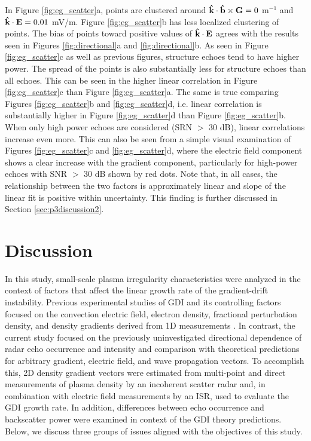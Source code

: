 In Figure \ref{fig:eg_scatter}a, points are clustered around \(\mathbf{\hat{k}}\cdot\mathbf{\hat{b}}\times\mathbf{G} = 0\) m\(^{-1}\) and \(\mathbf{\hat{k}}\cdot\mathbf{E} = 0.01\) mV/m.  Figure \ref{fig:eg_scatter}b has less localized clustering of points.  The bias of points toward positive values of \(\mathbf{\hat{k}}\cdot\mathbf{E}\) agrees with the results seen in Figures \ref{fig:directional}a and \ref{fig:directional}b.  As seen in Figure \ref{fig:eg_scatter}c as well as previous figures, structure echoes tend to have higher power.  The spread of the points is also substantially less for structure echoes than all echoes.  This can be seen in the higher linear correlation in Figure \ref{fig:eg_scatter}c than Figure \ref{fig:eg_scatter}a.  The same is true comparing Figures \ref{fig:eg_scatter}b and \ref{fig:eg_scatter}d, i.e. linear correlation is substantially higher in Figure \ref{fig:eg_scatter}d than Figure \ref{fig:eg_scatter}b. When only high power echoes are considered (SRN \(>\) 30 dB), linear correlations increase even more.  This can also be seen from a simple visual examination of Figures \ref{fig:eg_scatter}c and \ref{fig:eg_scatter}d, where the electric field component shows a clear increase with the gradient component, particularly for high-power echoes with SNR \(>\) 30 dB shown by red dots. Note that, in all cases, the relationship between the two factors is approximately linear and slope of the linear fit is positive within uncertainty. This finding is further discussed in Section \ref{sec:p3discussion2}.




\section{Discussion}
\label{sec:p3discussion}
In this study, small-scale plasma irregularity characteristics were analyzed in the context of factors that affect the linear growth rate of the gradient-drift instability.  Previous experimental studies of GDI and its controlling factors focused on the convection electric field, electron density, fractional perturbation density, and density gradients derived from 1D measurements \citep[e.g.][]{Villian1986,Fukumoto1999,Fukumoto2000,Danskin2002,Oksavik2010,Moen2012,Makarevich2014b,Burston2016}.  In contrast, the current study focused on the previously uninvestigated directional dependence of radar echo occurrence and intensity and comparison with theoretical predictions for arbitrary gradient, electric field, and wave propagation vectors. To accomplish this, 2D density gradient vectors were estimated from multi-point and direct measurements of plasma density by an incoherent scatter radar and, in combination with electric field measurements by an ISR, used to evaluate the GDI growth rate.  In addition, differences between echo occurrence and backscatter power were examined in context of the GDI theory predictions. Below, we discuss three groups of issues aligned with the objectives of this study.



